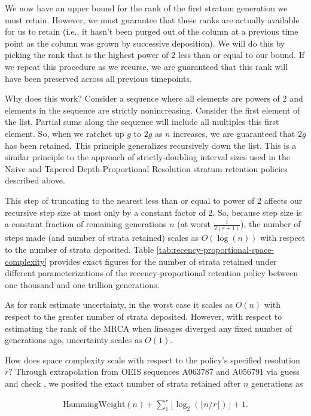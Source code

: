We now have an upper bound for the rank of the first stratum generation we must retain.
However, we must guarantee that these ranks are actually available for us to retain (i.e., it hasn't been purged out of the column at a previous time point as the column was grown by successive deposition).
We will do this by picking the rank that is the highest power of 2 less than or equal to our bound.
If we repeat this procedure as we recurse, we are guaranteed that this rank will have been preserved across all previous timepoints.

Why does this work?
Consider a sequence where all elements are powers of 2 and elements in the sequence are strictly nonincreasing.
Consider the first element of the list.
Partial sums along the sequence will include all multiples this first element.
So, when we ratchet up $g$ to $2g$ as $n$ increases, we are guaranteed that $2g$ has been retained.
This principle generalizes recursively down the list.
This is a similar principle to the approach of strictly-doubling interval sizes used in the Naive and Tapered Depth-Proportional Resolution stratum retention policies described above.

This step of truncating to the nearest less than or equal to power of 2 affects our recursive step size at most only by a constant factor of 2.
So, because step size is a constant fraction of remaining generations $n$ (at worst $\frac{1}{2(r+1)}$), the number of steps made (and number of strata retained) scales as $O(\log(n))$ with respect to the number of strata deposited.
Table \ref{tab:recency-proportional-space-complexity} provides exact figures for the number of strata retained under different parameterizations of the recency-proportional retention policy between one thousand and one trillion generations.

As for rank estimate uncertainty, in the worst case it scales as $O(n)$ with respect to the greater number of strata deposited.
However, with respect to estimating the rank of the MRCA when lineages diverged any fixed number of generations ago, uncertainty scales as $O(1)$.

How does space complexity scale with respect to the policy's specified resolution $r$?
Through extrapolation from OEIS sequences A063787 and A056791 via guess and check \citep{sloane2021a063787,sloane2021a056791}, we posited the exact number of strata retained after $n$ generations as

\begin{align*}
  \mathrm{HammingWeight}(n)
  + \sum_1^r \lfloor \log_2( \lfloor n / r \rfloor ) \rfloor
  + 1.
\end{align*}

